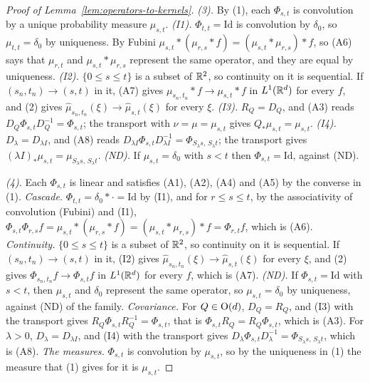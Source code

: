\begin{proof}[Proof of Lemma~\ref{lem:operators-to-kernels}]
\emph{(3).} By (1), each $\Phi_{s,t}$ is convolution by a unique probability measure
$\mu_{s,t}$. \emph{(I1).} $\Phi_{t,t} = \mathrm{Id}$ is convolution by $\delta_0$, so
$\mu_{t,t} = \delta_0$ by uniqueness. By Fubini
$\mu_{s,t} * (\mu_{r,s} * f) = (\mu_{s,t} * \mu_{r,s}) * f$, so (A6) says that $\mu_{r,t}$ and
$\mu_{s,t} * \mu_{r,s}$ represent the same operator, and they are equal by uniqueness.
\emph{(I2).} $\{0 \le s \le t\}$ is a subset of $\mathbb{R}^2$, so continuity on it is sequential. If
$(s_n,t_n) \to (s,t)$ in it, (A7) gives $\mu_{s_n,t_n} * f \to \mu_{s,t} * f$ in $L^1(\mathbb{R}^d)$ for
every $f$, and (2) gives $\widehat\mu_{s_n,t_n}(\xi) \to \widehat\mu_{s,t}(\xi)$ for every
$\xi$. \emph{(I3).} $R_Q = D_Q$, and (A3) reads $D_Q\Phi_{s,t}D_Q^{-1} = \Phi_{s,t}$; the
transport with $\nu = \mu = \mu_{s,t}$ gives $Q_*\mu_{s,t} = \mu_{s,t}$. \emph{(I4).}
$D_\lambda = D_{\lambda I}$, and (A8) reads
$D_{\lambda I}\Phi_{s,t}D_{\lambda I}^{-1} = \Phi_{S_\lambda s,\,S_\lambda t}$; the transport gives
$(\lambda I)_*\mu_{s,t} = \mu_{S_\lambda s,\,S_\lambda t}$. \emph{(ND).} If $\mu_{s,t} = \delta_0$
with $s < t$ then $\Phi_{s,t} = \mathrm{Id}$, against (ND).

\emph{(4).} Each $\Phi_{s,t}$ is linear and satisfies (A1), (A2), (A4) and (A5) by the converse
in (1). \emph{Cascade.} $\Phi_{t,t} = \delta_0 * \cdot = \mathrm{Id}$ by (I1), and for
$r \le s \le t$, by the associativity of convolution (Fubini) and (I1),
$\Phi_{s,t}\Phi_{r,s}f = \mu_{s,t} * (\mu_{r,s} * f) = (\mu_{s,t} * \mu_{r,s}) * f
= \Phi_{r,t}f$, which is (A6). \emph{Continuity.} $\{0 \le s \le t\}$ is a subset of $\mathbb{R}^2$, so
continuity on it is sequential. If $(s_n,t_n) \to (s,t)$ in it, (I2) gives
$\widehat\mu_{s_n,t_n}(\xi) \to \widehat\mu_{s,t}(\xi)$ for every $\xi$, and (2) gives
$\Phi_{s_n,t_n}f \to \Phi_{s,t}f$ in $L^1(\mathbb{R}^d)$ for every $f$, which is (A7). \emph{(ND).} If
$\Phi_{s,t} = \mathrm{Id}$ with $s < t$, then $\mu_{s,t}$ and $\delta_0$ represent the same
operator, so $\mu_{s,t} = \delta_0$ by uniqueness, against (ND) of the family.
\emph{Covariance.} For $Q \in \mathrm{O}(d)$, $D_Q = R_Q$, and (I3) with the
transport gives $R_Q\Phi_{s,t}R_Q^{-1} = \Phi_{s,t}$, that is
$\Phi_{s,t}R_Q = R_Q\Phi_{s,t}$, which is (A3). For $\lambda > 0$, $D_\lambda = D_{\lambda I}$, and
(I4) with the transport gives $D_\lambda\Phi_{s,t}D_\lambda^{-1} = \Phi_{S_\lambda s,\,S_\lambda t}$,
which is (A8). \emph{The measures.} $\Phi_{s,t}$ is convolution by $\mu_{s,t}$, so by the
uniqueness in (1) the measure that (1) gives for it is $\mu_{s,t}$.
\end{proof}

